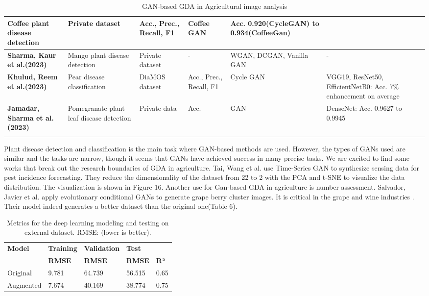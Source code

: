 \documentclass[preprint,12pt,authoryear]{elsarticle}
\begin{document}
{\begin{longtable}{|p{2.1cm}|p{2cm}|p{2cm}|p{1.5cm}|p{1.5cm}|p{2cm}|}
  Coffee plant disease detection &
  Private dataset &
  Acc., Prec., Recall, F1 &
  Coffee GAN &
  Acc. 0.920(CycleGAN) to 0.934(CoffeeGan) \\ \hline
\textbf{Sharma, Kaur et al.(2023)}\cite{apl43} &
  Mango plant disease detection &
  Private dataset &
  - &
  WGAN, DCGAN, Vanilla GAN &
  - \\ \hline
\textbf{Khulud, Reem et al.(2023)}\cite{apl44} &
  Pear disease classification &
  DiaMOS dataset\cite{apl50} &
  Acc., Prec., Recall, F1 &
  Cycle GAN &
  VGG19, ResNet50, EfficientNetB0: Acc. 7\% enhancement on average 
  \\ \hline
\textbf{Jamadar, Sharma et al.(2023)}\cite{apl45} &
  Pomegranate plant leaf disease detection &
  Private data &
  Acc. &
  GAN &
  DenseNet: Acc. 0.9627 to 0.9945 \\ \hline
\caption{GAN-based GDA in Agricultural image analysis}
\end{longtable}}

Plant disease detection and classification is the main task where GAN-based methods are used. However, the types of GANs used are similar and the tasks are narrow, though it seems that GANs have achieved success in many precise tasks. We are excited to find some works that break out the research boundaries of GDA in agriculture. Tai, Wang et al. use Time-Series GAN to synthesize sensing data for pest incidence forecasting\cite{apl51}. They reduce the dimensionality of the dataset from 22 to 2 with the PCA and t-SNE to visualize the data distribution. The visualization is shown in Figure 16. Another use for Gan-based GDA in agriculture is number assessment. Salvador, Javier et al. apply evolutionary conditional GANs to generate grape berry cluster images. It is critical in the grape and wine industries\cite{apl53} \cite{apl54}. Their model indeed generates a better dataset than the original one(Table 6).

\begin{table}[h]
\centering
\begin{tabular}{lllll}
\hline
\textbf{Model} & \textbf{Training} & \textbf{Validation} & \multicolumn{2}{l}{\textbf{Test}} \\ \cline{4-5} 
          & \textbf{RMSE} & \textbf{RMSE} & \textbf{RMSE} & \textbf{R²} \\
Original  & 9.781         & 64.739        & 56.515        & 0.65        \\
Augmented & 7.674         & 40.169        & 38.774        & 0.75        \\ \hline
\end{tabular}
\caption{Metrics for the deep learning modeling and testing on external dataset. RMSE: (lower is better).}
\label{tab:my-table}
\end{table}
\end{document}
